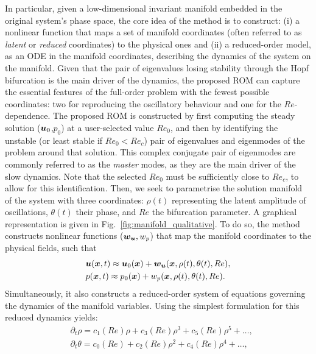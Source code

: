 \documentclass[%
reprint,
superscriptaddress,
 amsmath,amssymb,
 aps,
 pre
]{revtex4-2}
\begin{document}
In particular, given a low-dimensional invariant manifold embedded in the original system's phase space, the core idea of the method is to construct: (i) a nonlinear function that maps a set of manifold coordinates (often referred to as \textit{latent} or \textit{reduced} coordinates) to the physical ones and (ii) a reduced-order model, as an ODE in the manifold coordinates, describing the dynamics of the system on the manifold.
Given that the pair of eigenvalues losing stability through the Hopf bifurcation is the main driver of the dynamics, the proposed ROM can capture the essential features of the full-order problem with the fewest possible coordinates: two for reproducing the oscillatory behaviour and one for the $Re$-dependence. 
The proposed ROM is constructed by first computing the steady solution (${\boldsymbol{u}}_0$,$p_0$) at a user-selected value $Re_0$, and then by identifying the unstable (or least stable if $Re_0<Re_c$) pair of eigenvalues and eigenmodes of the problem around that solution. This complex conjugate pair of eigenmodes are commonly referred to as the \textit{master} modes, as they are the main driver of the slow dynamics. Note that the selected $Re_0$ must be sufficiently close to $Re_c$, to allow for this identification.
Then, we seek to parametrise the solution manifold of the system with three coordinates: $\rho(t)$ representing the latent amplitude of oscillations, $\theta(t)$ their phase, and $Re$ the bifurcation parameter. A graphical representation is given in Fig.~\ref{fig:manifold_qualitative}. To do so, the method constructs nonlinear functions ($\boldsymbol{w}_{\boldsymbol{u}},w_p$) that map the manifold coordinates to the physical fields, such that
\begin{subequations}\label{eq:maps}
    \begin{align}
    &{\boldsymbol{u}}({\boldsymbol{x}},t) \approx 
    {\boldsymbol{u}}_0({\boldsymbol{x}})+
    \boldsymbol{w}_{\boldsymbol{u}}({\boldsymbol{x}},\rho(t),\theta(t),Re),
    \\
    &p({\boldsymbol{x}},t) \approx 
    p_0({\boldsymbol{x}}) +
    w_p({\boldsymbol{x}},\rho(t),\theta(t),Re).
\end{align}\end{subequations}
Simultaneously, it also constructs a reduced-order system of equations governing the dynamics of the manifold variables. Using the simplest formulation for this reduced dynamics yields:
\begin{subequations}\label{eq:ROMredyn}
\begin{align}
    \label{eq:ROM1}
    &\partial_t\rho = c_1(Re) \rho + 
    c_3(Re) \rho^3 + 
    c_5(Re) \rho^5 + \dots,
    \\
    \label{eq:ROM2}
    &\partial_t\theta = 
    c_0(Re) +
    c_2(Re) \rho^2 +
    c_4(Re) \rho^4 + \dots,
\end{align}
\end{subequations}
\end{document}
